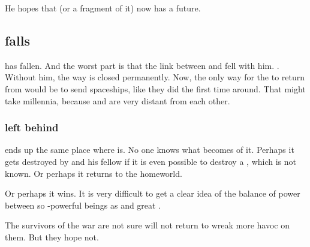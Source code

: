 
He hopes that \Miith{} (or a fragment of it) now has a future. 












\subsection{\Daggerrain falls}
\Daggerrain{} has fallen. 
And the worst part is that the link between \Erebos{} and \Nyx{} fell with him. 
. Without him, the way is closed permanently. 
Now, the only way for the \banes{} to return from \Erebos{} would be to send spaceships, like they did the first time around. 
That might take millennia, because \Erebos{} and \Miith{} are very distant from each other. 





\subsubsection{\HothNrul{} left behind}
\HothNrul{} ends up the same place where \Daggerrain{} is. 
No one knows what becomes of it. 
Perhaps it gets destroyed by \Daggerrain{} and his fellow \banelords\prikker if it is even possible to destroy a \xs, which is not known. 
Or perhaps it returns to the \xs{} homeworld. 

Or perhaps it wins. 
It is very difficult to get a clear idea of the balance of power between so \uber-powerful beings as \xss{} and great \banelords. 

The survivors of the war are not sure \HothNrul{} will not return to wreak more havoc on them. 
But they hope not. 















